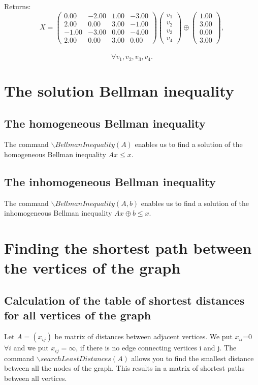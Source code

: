 Returns:\\
$$X=
 \left(\begin{array}{cccc}
0.00 & -2.00 & 1.00 & -3.00\\
2.00 & 0.00 & 3.00 & -1.00\\
-1.00 & -3.00 & 0.00 & -4.00\\
2.00 & 0.00 & 3.00 & 0.00
\end{array}\right)
\left(\begin{array}{c}
v_{1}\\
v_{2}\\
v_{3}\\
v_{4}
\end{array}\right)
\oplus\left(\begin{array}{c}
1.00\\
3.00\\
0.00\\
3.00
\end{array}\right),$$\\ $$\forall v_{1}, v_{2}, v_{3}, v_{4}.$$
\section{The solution Bellman inequality}
\subsection{The homogeneous Bellman inequality}
 
The command $\backslash BellmanInequality(A)$ enables us to find a solution of the homogeneous Bellman inequality $Ax\leq x$.

\subsection{The inhomogeneous Bellman inequality}
The command $\backslash BellmanInequality(A, b)$ enables us to find a solution of the inhomogeneous Bellman inequality $Ax\oplus b\leq x$.

\section{Finding the shortest path between the vertices of the graph}
\subsection {Calculation of the table of shortest distances for all vertices of the graph}
Let $A=(x_{ij})$ be matrix of distances between adjacent vertices. We put $x_{ii}$=0 $\forall i$ and we put $x_{ij}=\infty$, if there is no edge connecting vertices i and j.
The command $\backslash searchLeastDistances(A)$ allows you to find the smallest distance between all the nodes of the graph.
This results in a matrix of shortest paths between all vertices.
 
